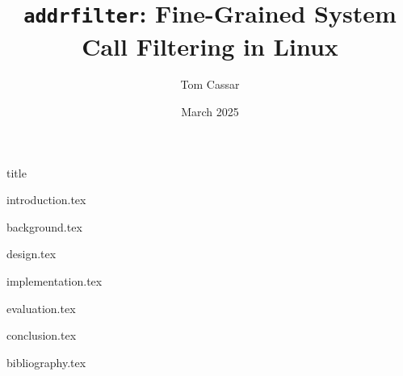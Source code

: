 \documentclass[fontsize=12pt]{article}
\title{\texttt{addrfilter}: Fine-Grained System Call Filtering in Linux}
\author{Tom Cassar}
\date{March 2025}
\begin{document}
{title}

\clearpage
\thispagestyle{empty}

\begin{multicols*}{2}

{introduction.tex}

\clearpage
\thispagestyle{empty}

{background.tex}

\clearpage
\thispagestyle{empty}

{design.tex}

\clearpage
\thispagestyle{empty}

{implementation.tex}

\clearpage
\thispagestyle{empty}

{evaluation.tex}

\clearpage
\thispagestyle{empty}

{conclusion.tex}

\clearpage
\thispagestyle{empty}

{bibliography.tex}

\end{multicols*}
\end{document}
